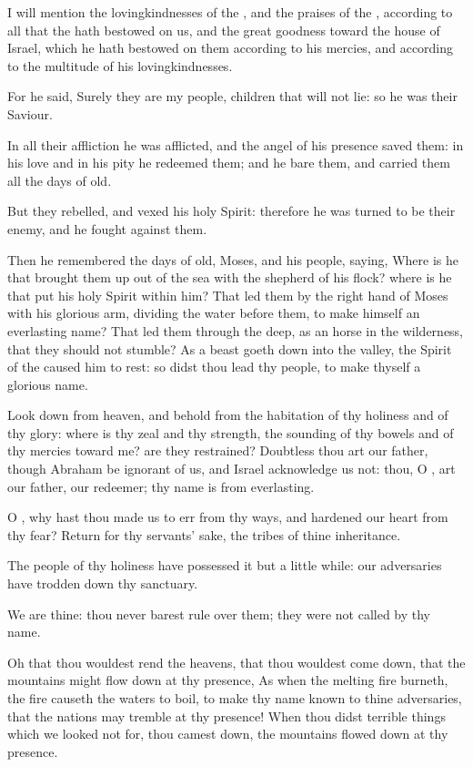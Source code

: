 \Verse I will mention the lovingkindnesses of the \LORD, and the praises of the \LORD, according to all that the \LORD hath bestowed on us, and the great goodness toward the house of Israel, which he hath bestowed on them according to his mercies, and according to the multitude of his lovingkindnesses.

\Verse For he said, Surely they are my people, children that will not lie: so he was their Saviour.

\Verse In all their affliction he was afflicted, and the angel of his presence saved them: in his love and in his pity he redeemed them; and he bare them, and carried them all the days of old.

\Verse But they rebelled, and vexed his holy Spirit: therefore he was turned to be their enemy, and he fought against them.

\Verse Then he remembered the days of old, Moses, and his people, saying, Where is he that brought them up out of the sea with the shepherd of his flock? where is he that put his holy Spirit within him?  \Verse That led them by the right hand of Moses with his glorious arm, dividing the water before them, to make himself an everlasting name?  \Verse That led them through the deep, as an horse in the wilderness, that they should not stumble?  \Verse As a beast goeth down into the valley, the Spirit of the \LORD caused him to rest: so didst thou lead thy people, to make thyself a glorious name.

\Verse Look down from heaven, and behold from the habitation of thy holiness and of thy glory: where is thy zeal and thy strength, the sounding of thy bowels and of thy mercies toward me? are they restrained?  \Verse Doubtless thou art our father, though Abraham be ignorant of us, and Israel acknowledge us not: thou, O \LORD, art our father, our redeemer; thy name is from everlasting.

\Verse O \LORD, why hast thou made us to err from thy ways, and hardened our heart from thy fear? Return for thy servants' sake, the tribes of thine inheritance.

\Verse The people of thy holiness have possessed it but a little while: our adversaries have trodden down thy sanctuary.

\Verse We are thine: thou never barest rule over them; they were not called by thy name.


\Chapter
\Verse Oh that thou wouldest rend the heavens, that thou wouldest come down, that the mountains might flow down at thy presence, \Verse As when the melting fire burneth, the fire causeth the waters to boil, to make thy name known to thine adversaries, that the nations may tremble at thy presence!  \Verse When thou didst terrible things which we looked not for, thou camest down, the mountains flowed down at thy presence.

